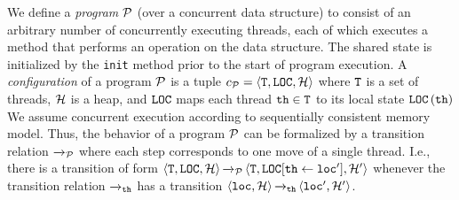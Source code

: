 We define a {\em program} ${\mathcal P}$ (over a concurrent data structure) to consist 
of an arbitrary number of concurrently executing threads, each of which
executes a method
that performs an operation on the data structure.
The shared state is initialized
by the {\tt init} method prior to the start of program execution.
A {\it configuration} of a program ${\mathcal P}$ is a tuple
$c_{{\mathcal P}} = \left\langle{\tt T},{\tt LOC},{\mathcal H}\right\rangle$ where
${\tt T}$ is a set of threads,
${\mathcal H}$ is a heap, and ${\tt LOC}$
maps each thread ${\tt th}\in{\tt T}$ to its
local state ${\tt LOC}\left({\tt th}\right)$
We assume concurrent execution according to sequentially consistent memory
model. Thus,
the behavior of a program ${\mathcal P}$ can be formalized by a transition relation
${\xrightarrow{}{}}_{\!\!{\mathcal P}}$ where each step corresponds to one move of a single thread.
I.e., 
there is a transition of form
$\left\langle{\tt T},{\tt LOC},{\mathcal H}\right\rangle
{\xrightarrow{}{}}_{\!\!{\mathcal P}}
\left\langle{\tt T},{\tt LOC}[{\tt th}\leftarrow{\tt loc}'],{\mathcal H}'\right\rangle$
whenever the transition relation ${\xrightarrow{}{}}_{\!\!{\tt th}}$ has a transition
$\left\langle{\tt loc},{\mathcal H}\right\rangle{\xrightarrow{}{}}_{\!\!{\tt th}}\left\langle{\tt loc}',{\mathcal H}'\right\rangle$.

